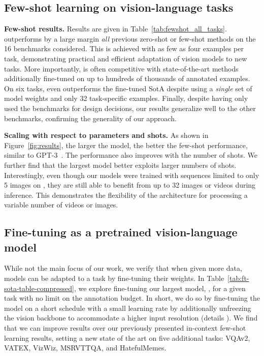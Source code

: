 \subsection{Few-shot learning on vision-language tasks}
\label{sec:fewshot_openended}






\textbf{Few-shot results.}
Results are given in Table~\ref{tab:fewshot_all_tasks}.
\largem{} outperforms by a large margin \emph{all} previous zero-shot or few-shot methods on the 16 benchmarks considered.
This is achieved with as few as four examples per task, demonstrating practical and efficient adaptation of vision models to new tasks.
More importantly, \largem{} is often competitive with state-of-the-art methods additionally fine-tuned on up to hundreds of thousands of annotated examples.
On six tasks, \largem{} even outperforms the fine-tuned SotA despite using a \emph{single} set of model weights and only 32 task-specific examples.
Finally, despite having only used the \dev{} benchmarks for design decisions, our results generalize well to the other benchmarks, confirming the generality of our approach.

\textbf{Scaling with respect to parameters and shots.}
As shown in Figure~\ref{fig:results}, the larger the model, the better the few-shot performance, similar to GPT-3~\citep{gpt3}.
The performance also improves with the number of shots.
We further find that the largest model better exploits larger numbers of shots.
Interestingly, even though our \method{} models were trained with sequences limited to only 5 images on \mmmw{}, they are still able to benefit from up to 32 images or videos during inference.
This demonstrates the flexibility of the \method{} architecture for processing a variable number of videos or images.


\subsection{Fine-tuning \largem{} as a pretrained vision-language model}
\label{sec:ft_results}

While not the main focus of our work, we verify that when given more data, \method{} models can be adapted to a task by fine-tuning their weights.
In Table~\ref{tab:ft-sota-table-compressed}, we explore fine-tuning our largest model, \largem{}, for a given task with no limit on the annotation budget.
In short, we do so by fine-tuning the model on a short schedule with a small learning rate by additionally unfreezing the vision backbone to accommodate a higher input resolution (details ).
We find that we can improve results over our previously presented in-context few-shot learning results, setting a new state of the art on five additional tasks: VQAv2, VATEX, VizWiz, MSRVTTQA, and HatefulMemes.

